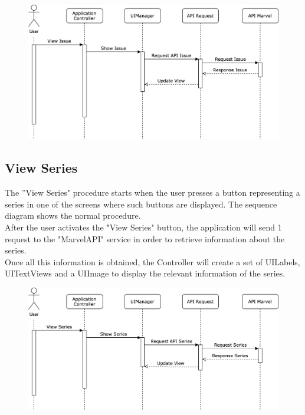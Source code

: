 \vspace{5mm}

\begin{figure}[h]
\centering
\includegraphics[width=\textwidth]{img/seqdiagrams/viewissue}
\end{figure}

\clearpage

\subsection{View Series}
The ”View Series" procedure starts when the user presses a button representing a series in one of the screens where such buttons are displayed. The sequence diagram shows the normal procedure. \\
After the user activates the "View Series" button, the application will send 1 request to the "MarvelAPI" service in order to retrieve information about the series. \\
Once all this information is obtained, the Controller will create a set of UILabels, UITextViews and a UIImage to display the relevant information of the series. 

\vspace{5mm}

\begin{figure}[h]
\centering
\includegraphics[width=\textwidth]{img/seqdiagrams/viewseries}
\end{figure}


